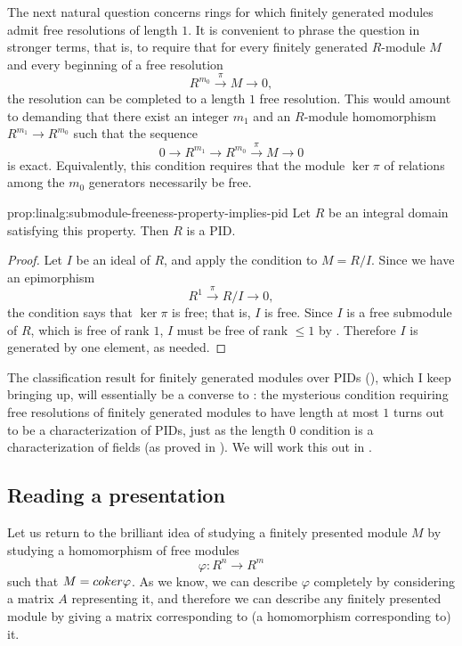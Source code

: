 The next natural question concerns rings for which finitely generated
modules admit free resolutions of length $1$. It is convenient to
phrase the question in stronger terms, that is, to require that for
every finitely generated $R$-module $M$ and every beginning of a free
resolution
\[
  R^{m_0} \xrightarrow{\pi} M \to 0,
\]
the resolution can be completed to a length $1$ free resolution. This
would amount to demanding that there exist an integer $m_1$ and an
$R$-module homomorphism $R^{m_1} \to R^{m_0}$ such that the sequence
\[
  0 \to R^{m_1} \to R^{m_0} \xrightarrow{\pi} M \to 0
\]
is exact. Equivalently, this condition requires that the module
$\ker\pi$ of relations among the $m_0$ generators necessarily be free.

\begin{prop}{}{prop:linalg:submodule-freeness-property-implies-pid}
  Let $R$ be an integral domain satisfying this property. Then $R$ is
  a PID.
\end{prop}
\begin{proof}
  Let $I$ be an ideal of $R$, and apply the condition to $M =
  R/I$. Since we have an epimorphism
  \[
    R^1 \xrightarrow{\pi} R/I \to 0,
  \]
  the condition says that $\ker\pi$ is free; that is, $I$ is
  free. Since $I$ is a free submodule of $R$, which is free of rank
  $1$, $I$ must be free of rank $\leq 1$ by
  . Therefore $I$ is generated by one element, as
  needed.
\end{proof}

The classification result for finitely generated modules over PIDs
(), which I keep bringing up, will essentially be a
converse to : the mysterious condition requiring
free resolutions of finitely generated modules to have length at most
$1$ turns out to be a characterization of PIDs, just as the length $0$
condition is a characterization of fields (as proved in
). We will work this out in
.

\subsection{Reading a presentation}
\label{subsec:linalg:reading-a-presentation}
Let us return to the brilliant idea of studying a finitely presented
module $M$ by studying a homomorphism of free modules
\[
  \tag{*} \varphi : R^n \to R^m
\]
such that $M = coker\varphi$. As we know, we can describe $\varphi$
completely by considering a matrix $A$ representing it, and therefore
we can describe any finitely presented module by giving a matrix
corresponding to (a homomorphism corresponding to) it.

